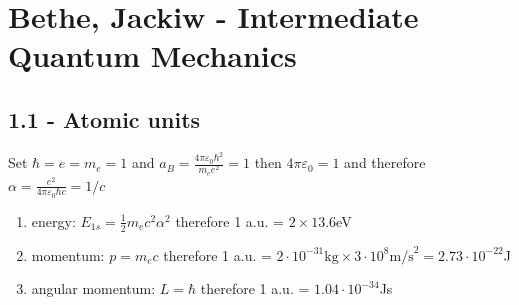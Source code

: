 \documentclass[10pt,a4paper]{book}
\theoremstyle{definition}
\begin{document}
\section{{\sc Bethe, Jackiw} - Intermediate Quantum Mechanics}
\subsection{1.1 - Atomic units}
Set $\hbar=e=m_e=1$ and $a_B=\frac{4\pi\varepsilon_0\hbar^2}{m_ee^2}=1$ then $4\pi\varepsilon_0=1$ and therefore $\alpha=\frac{e^2}{4\pi\varepsilon_0\hbar c}=1/c$
\begin{enumerate}
\item energy: $E_{1s}=\frac{1}{2}m_ec^2\alpha^2$ therefore 1 a.u. = $2\times13.6$eV
\item momentum: $p=m_e c$ therefore 1 a.u. = $2\cdot 10^{-31}\text{kg}\times 3\cdot 10^8\text{m/s}^2=2.73\cdot10^{-22}$J
\item angular momentum: $L=\hbar$ therefore 1 a.u. = $1.04\cdot10^{-34}$Js 
\end{enumerate}
\end{document}
